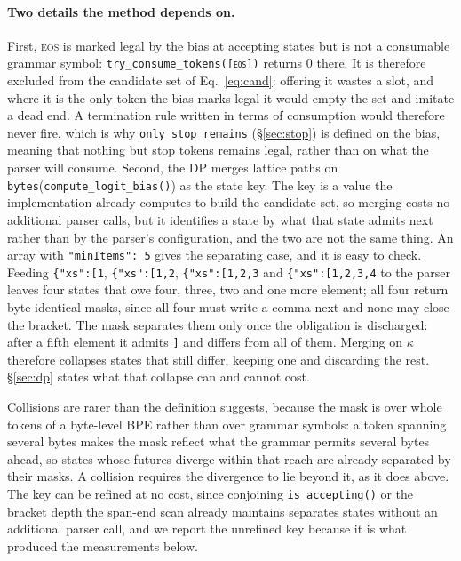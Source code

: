 \paragraph{Two details the method depends on.}
First, \textsc{eos} is marked legal by the bias at accepting states but is not a
consumable grammar symbol: \texttt{try\_consume\_tokens([\textsc{eos}])} returns
$0$ there. It is therefore excluded from the candidate set of
Eq.~\ref{eq:cand}: offering it wastes a slot, and where it is the only token the
bias marks legal it would empty the set and imitate a dead end. A termination rule written in terms of consumption would therefore
never fire, which is why \texttt{only\_stop\_remains} (\S\ref{sec:stop}) is
defined on the bias, meaning that nothing but stop tokens remains legal, rather
than on what the parser will consume. Second, the DP merges lattice paths on
\texttt{bytes}(\texttt{compute\_logit\_bias()}) as the state key. The key is a
value the implementation already computes to build the candidate set, so merging
costs no additional parser calls, but it identifies a state by what that state
admits next rather than by the parser's configuration, and the two are not the
same thing. An array with \texttt{"minItems": 5} gives the separating case, and it is easy to
check. Feeding \texttt{\{"xs":[1}, \texttt{\{"xs":[1,2}, \texttt{\{"xs":[1,2,3}
and \texttt{\{"xs":[1,2,3,4} to the parser leaves four states that owe four,
three, two and one more element; all four return byte-identical masks, since all
four must write a comma next and none may close the bracket. The mask separates
them only once the obligation is discharged: after a fifth element it admits
\texttt{]} and differs from all of them. Merging on $\kappa$ therefore collapses
states that still differ, keeping one and discarding the rest.
\S\ref{sec:dp} states what that collapse can and cannot cost.

Collisions are rarer than the definition suggests, because the mask is over whole
tokens of a byte-level BPE rather than over grammar symbols: a token spanning
several bytes makes the mask reflect what the grammar permits several bytes
ahead, so states whose futures diverge within that reach are already separated by
their masks. A collision requires the divergence to lie beyond it, as it does
above. The key can be refined at no cost, since conjoining
\texttt{is\_accepting()} or the bracket depth the span-end scan already maintains
separates states without an additional parser call, and we report the unrefined
key because it is what produced the measurements below.

